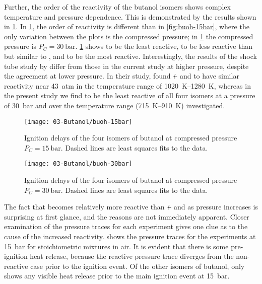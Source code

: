 \documentclass[../main.tex]{subfiles}
\begin{document}
Further, the order of the reactivity of the butanol isomers shows complex
temperature and pressure dependence. This is demonstrated by the results shown
in \cref{fig:buoh-30bar}. In \cref{fig:buoh-30bar}, the order of
reactivity is different than in \cref{fig:buoh-15bar}, where the only
variation between the plots is the compressed pressure; in
\cref{fig:buoh-30bar} the compressed pressure is $P_C=\SI{30}{\bar}$.
\cref{fig:buoh-30bar} shows \iBuOH{} to be the least reactive,
\sBuOH{} to be less reactive than but similar to \tBuOH{},
and \nBuOH{} to be the most reactive. Interestingly, the results of
the shock tube study by \textcite{Stranic2012} differ from those in the current
study at higher pressure, despite the agreement at lower pressure. In their
study, \textcite{Stranic2012} found \textit{i}- and \nBuOH{} to have
similar reactivity near \SI{43}{atm} in the temperature range of \SIrange{1020}{1280}{\kelvin},
whereas in the present study we find \iBuOH{} to be the least
reactive of all four isomers at a pressure of \SI{30}{\bar} and over the temperature
range (\SIrange{715}{910}{\kelvin}) investigated.

\begin{figure}
    \begin{floatrow}
    \ffigbox
        {\texttt{[image: 03-Butanol/buoh-15bar]}}
        {\caption{Ignition delays of the four isomers of butanol at compressed
            pressure $P_C=\SI{15}{\bar}$. Dashed lines are least squares fits to the
            data.}
        \label{fig:buoh-15bar}}
    \ffigbox
        {\texttt{[image: 03-Butanol/buoh-30bar]}}
        {\caption{Ignition delays of the four isomers of butanol at compressed
            pressure $P_C=\SI{30}{\bar}$. Dashed lines are least squares fits to the
            data.}
        \label{fig:buoh-30bar}}
    \end{floatrow}
\end{figure}

The fact that \tBuOH{} becomes relatively more reactive than
\textit{i}- and \sBuOH{} as pressure increases is surprising at first
glance, and the reasons are not immediately apparent. Closer examination of the
pressure traces for each experiment gives one clue as to the cause of the
increased reactivity.  shows the pressure traces for
the \tBuOH{} experiments at \SI{15}{\bar} for stoichiometric mixtures in
air. It is evident that there is some pre-ignition heat release, because the
reactive pressure trace diverges from the non-reactive case prior to the
ignition event. Of the other isomers of butanol, only \nBuOH{} shows
any visible heat release prior to the main ignition event at \SI{15}{\bar}.
\end{document}
